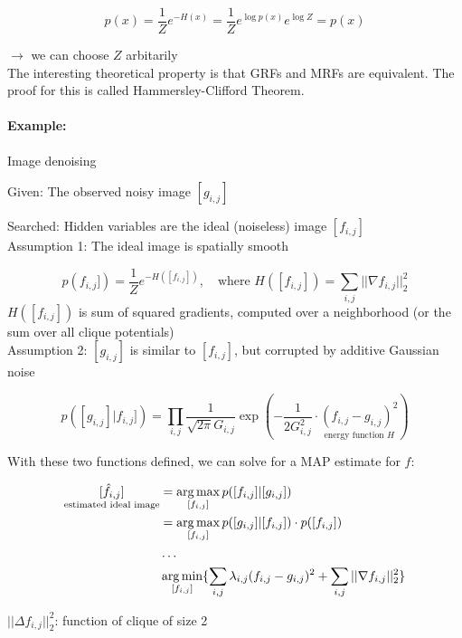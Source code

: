 \begin{equation*}
	p(x) = \frac{1}{Z} e^{-H(x)} = \frac{1}{Z} e^{\log p(x)} e^{\log Z}  = p(x)
\end{equation*}

$\rightarrow$ we can choose $Z$ arbitarily\\

The interesting theoretical property is that GRFs and MRFs are equivalent. The proof for this is called Hammersley-Clifford Theorem.

\paragraph{Example:} Image denoising

Given: The observed noisy image $[g_{i,j}]$

Searched: Hidden variables are the ideal (noiseless) image $[f_{i,j}]$\\

Assumption 1: The ideal image is spatially smooth

\begin{equation*}
	p(f_{i,j}]) = \frac{1}{Z} e^{-H([f_{i,j}])}, \quad \text{where } H([f_{i,j}]) = \sum_{i,j} ||\nabla f_{i,j}||_2^2
\end{equation*}
$ H([f_{i,j}]) $ is sum of squared gradients, computed over a neighborhood (or the sum over all clique potentials)\\

Assumption 2: $[g_{i,j}]$ is similar to $[f_{i,j}]$, but corrupted by additive Gaussian noise

\begin{equation*}
	p([g_{i,j}] | f_{i,j}]) = \prod_{i,j} \frac{1}{\sqrt{2 \pi} G_{i,j}} \exp(- \frac{1}{2 G_{i,j}^2} \cdot \underset{\text{energy function $H$}}{(f_{i,j} - g_{i,j})^2})
\end{equation*}

With these two functions defined, we can solve for a MAP estimate for $f$:

\begin{align*}
	\underset{\text{estimated ideal image}}{[\hat{f}_{i,j}]} &= \operatorname*{arg\,max}_{[f_{i,j}]} p([f_{i,j}] | [g_{i,j}])\\
					&= \operatorname*{arg\,max}_{[f_{i,j}]} p([g_{i,j}] | [f_{i,j}]) \cdot p([f_{i,j}])\\
					& \dots\\
					& \operatorname*{arg\,min}_{[f_{i,j}]} \{ \sum_{i,j} \lambda_{i,j} (f_{i,j} - g_{i,j})^2 + \sum_{i,j} ||\nabla f_{i,j}||_2^2\}
\end{align*}

\(||\Delta f_{i,j}||_2^2\): function of clique of size 2

